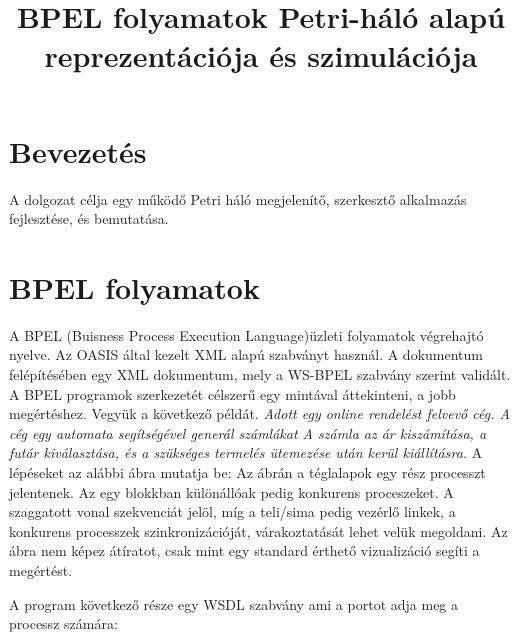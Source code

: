 \documentclass[12pt,a4paper]{book}
\date{\vspace{-5ex}}
\title{BPEL folyamatok Petri-háló alapú reprezentációja és szimulációja}
\begin{document}
\maketitle

\chapter{Bevezetés}

A dolgozat célja egy működő Petri háló  megjelenítő, szerkesztő %
alkalmazás fejlesztése, és bemutatása. %

\chapter{BPEL folyamatok}

A BPEL (Buisness Process Execution Language)üzleti folyamatok végrehajtó nyelve.
Az OASIS által kezelt XML alapú szabványt használ. 
A dokumentum felépítésében egy XML dokumentum, mely a WS-BPEL szabvány szerint validált. A BPEL programok szerkezetét célszerű egy mintával áttekinteni, a jobb megértéshez. %
Vegyük a következő példát.  \textsl{Adott egy online rendelést felvevő cég. A cég egy automata segítségével generál számlákat A számla az ár kiszámítása, a futár kiválasztása, és a szükséges termelés ütemezése után kerül kiállításra.} A lépéseket az alábbi ábra mutatja be: %
Az ábrán a téglalapok egy rész processzt jelentenek. Az egy blokkban különállóak pedig konkurens proceszeket. A szaggatott vonal szekvenciát jelöl, míg a teli/sima pedig vezérlő linkek, a konkurens processzek szinkronizációját, várakoztatását lehet velük megoldani. Az ábra nem képez átíratot, csak mint egy standard érthető vizualizáció segíti a megértést. 

A program következő része egy WSDL szabvány ami a portot adja meg a processz számára:
\newpage
\end{document}
